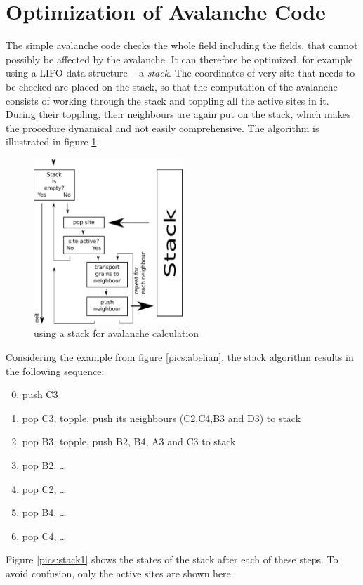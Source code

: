 \section{Optimization of Avalanche Code}
The simple avalanche code checks the whole field including the fields, that cannot possibly be affected by the avalanche. It can therefore be optimized, for example using a LIFO data structure -- a \emph{stack}. The coordinates of very site that needs to be checked are placed on the stack, so that the computation of the avalanche consists of working through the stack and toppling all the active sites in it. During their toppling, their neighbours are again put on the stack, which makes the procedure dynamical and not easily comprehensive. The algorithm is illustrated in figure \ref{pics:stack2}.

\begin{figure}[!htpb]
\centering
\includegraphics[width=0.5\textwidth]{pics/pic3_stack2.pdf}
\caption[]{using a stack for avalanche calculation}
\label{pics:stack2}
\end{figure}

Considering the example from figure \ref{pics:abelian}, the stack algorithm results in the following sequence:
\begin{enumerate}
 \setcounter{enumi}{-1}
 \item push C3
 \item pop C3, topple, push its neighbours (C2,C4,B3 and D3) to stack
 \item pop B3, topple, push B2, B4, A3 and C3 to stack
 \item pop B2, \ldots
 \item pop C2, \ldots
 \item pop B4, \ldots
 \item pop C4, \ldots
\end{enumerate}
Figure \ref{pics:stack1} shows the states of the stack after each of these steps. To avoid confusion, only the active sites are shown here.

